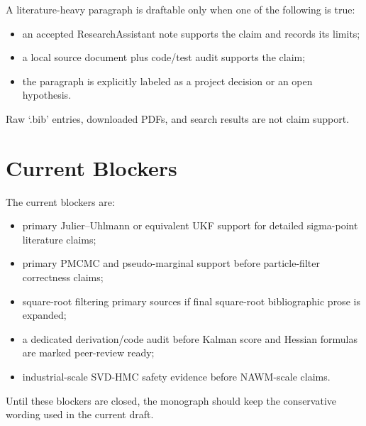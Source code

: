 A literature-heavy paragraph is draftable only when one of the following is
true:
\begin{itemize}
  \item an accepted ResearchAssistant note supports the claim and records its
    limits;
  \item a local source document plus code/test audit supports the claim;
  \item the paragraph is explicitly labeled as a project decision or an open
    hypothesis.
\end{itemize}
Raw `.bib' entries, downloaded PDFs, and search results are not claim support.

\section{Current Blockers}
\label{sec:bf-ra-current-blockers}

The current blockers are:
\begin{itemize}
  \item primary Julier--Uhlmann or equivalent UKF support for detailed
    sigma-point literature claims;
  \item primary PMCMC and pseudo-marginal support before particle-filter
    correctness claims;
  \item square-root filtering primary sources if final square-root
    bibliographic prose is expanded;
  \item a dedicated derivation/code audit before Kalman score and Hessian
    formulas are marked peer-review ready;
  \item industrial-scale SVD-HMC safety evidence before NAWM-scale claims.
\end{itemize}
Until these blockers are closed, the monograph should keep the conservative
wording used in the current draft.
